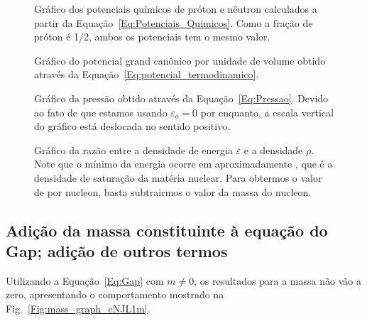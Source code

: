 \begin{enumerate}
\begin{figure}
	
	\caption{Gráfico dos potenciais químicos de próton e nêutron calculados a partir da Equação~\eqref{Eq:Potenciais_Quimicos}. Como a fração de próton é 1/2, ambos os potenciais tem o mesmo valor. \protect}
	\label{Fig:chemical_potential_graph}
\end{figure}

\begin{figure}
	
	\caption{Gráfico do potencial grand canônico por unidade de volume obtido através da Equação~\eqref{Eq:potencial_termodinamico}. \protect}
	\label{Fig:thermodynamic_potential_graph}
\end{figure}

\begin{figure}
	
	\caption{Gráfico da pressão obtido através da Equação~\eqref{Eq:Pressao}. Devido ao fato de que estamos usando $\varepsilon_o = 0$ por enquanto, a escala vertical do gráfico está deslocada no sentido positivo. \protect}
	\label{Fig:pressure_graph}
\end{figure}

\begin{figure}
	
	\caption{Gráfico da razão entre a densidade de energia $\varepsilon$ e a densidade $\rho$. Note que o mínimo da energia ocorre em aproximadamente , que é a densidade de saturação da matéria nuclear. Para obtermos o valor de  por nucleon, basta subtrairmos o valor da massa do nucleon. \protect}
	\label{Fig:energy_by_nucleon_graph}
\end{figure}

\FloatBarrier
\subsection{Adição da massa constituinte à equação do Gap; adição de outros termos}

Utilizando a Equação~\ref{Eq:Gap} com $m \neq 0$, os resultados para a massa não vão a zero, apresentando o comportamento mostrado na Fig.~\ref{Fig:mass_graph_eNJL1m}.


\end{enumerate}
